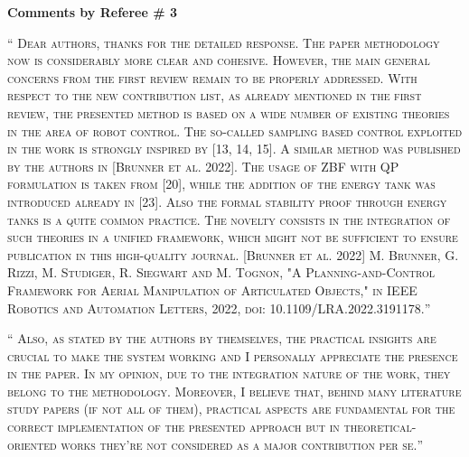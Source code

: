 \documentclass[10pt]{article}
\newcommand{\referee}[1]{\;
  \begin{minipage}[t]{.95\textwidth}
    ``{\small\color{red} \textsc{#1}}''
  \end{minipage}\medskip
  }
\begin{document}
\hspace*{-25pt} \textbf{\large Comments by Referee \# 3}
\begin{enumerate}[label={[R3:\,\arabic{enumi}]}]

\item\label{reply:R3:1}
\referee{Dear authors, thanks for the detailed response. The paper methodology now is considerably more clear and cohesive. However, the main general concerns from the first review remain to be properly addressed. With respect to the new contribution list, as already mentioned in the first review, the presented method is based on a wide number of existing theories in the area of robot control. The so-called sampling based control exploited in the work is strongly inspired by [13, 14, 15]. A similar method was published by the authors in [Brunner et al. 2022]. The usage of ZBF with QP formulation is taken from [20], while the addition of the energy tank was introduced already in [23]. Also the formal stability proof through energy tanks is a quite common practice. The novelty consists in the integration of such theories in a unified framework, which might not be sufficient to ensure publication in this high-quality journal. [Brunner et al. 2022] M. Brunner, G. Rizzi, M. Studiger, R. Siegwart and M. Tognon, "A Planning-and-Control Framework for Aerial Manipulation of Articulated Objects," in IEEE Robotics and Automation Letters, 2022, doi: 10.1109/LRA.2022.3191178.}


\item\label{reply:R3:2}
\referee{Also, as stated by the authors by themselves, the practical insights
are crucial to make the system working and I personally appreciate the
presence in the paper. In my opinion, due to the integration nature of
the work, they belong to the methodology. Moreover, I believe that,
behind many literature study papers (if not all of them), practical
aspects are fundamental for the correct implementation of the presented
approach but in theoretical-oriented works they’re not considered as a
major contribution per se.}


\end{enumerate}
\end{document}
